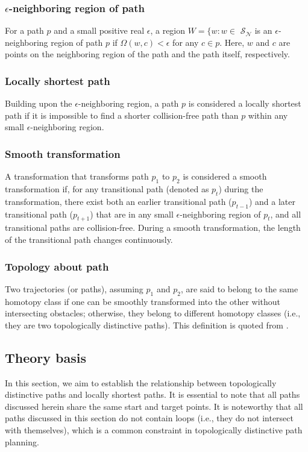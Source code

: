\documentclass[letterpaper, 10 pt, journal, twoside]{IEEEtran}
\begin{document}
\subsubsection{$\epsilon$-neighboring region of path \cite{liu1991proposal}}
For a path $p$ and a small positive real $\epsilon$, a region $W=\{w:w \in$ $\mathcal{S}_{\mathcal{N}}$ is an $\epsilon$-neighboring region of path $p$ if $\Omega(w, c) < \epsilon$ for any $c \in p$. Here, $w$ and $c$ are points on the neighboring region of the path and the path itself, respectively. 
\subsubsection{Locally shortest path}
Building upon the $\epsilon$-neighboring region, a path $p$ is considered a locally shortest path if it is impossible to find a shorter collision-free path than $p$ within any small $\epsilon$-neighboring region.

\subsubsection{Smooth transformation}
A transformation that transforms path $p_1$ to $p_2$ is considered a smooth transformation if, for any transitional path (denoted as $p_t$) during the transformation, there exist both an earlier transitional path ($p_{t-1}$) and a later transitional path ($p_{t+1}$) that are in any small $\epsilon$-neighboring region of $p_t$, and all transitional paths are collision-free. During a smooth transformation, the length of the transitional path changes continuously.

\subsubsection{Topology about path}
Two trajectories (or paths), assuming $p_1$ and $p_2$, are said to belong to the same homotopy class if one can be smoothly transformed into the other without intersecting obstacles; otherwise, they belong to different homotopy classes (i.e., they are two topologically distinctive paths). This definition is quoted from \cite{bhattacharya2010search}.


\subsection{Theory basis}

In this section, we aim to establish the relationship between topologically distinctive paths and locally shortest paths. It is essential to note that all paths discussed herein share the same start and target points. It is noteworthy that all paths discussed in this section do not contain loops (i.e., they do not intersect with themselves), which is a common constraint in topologically distinctive path planning.
\end{document}
